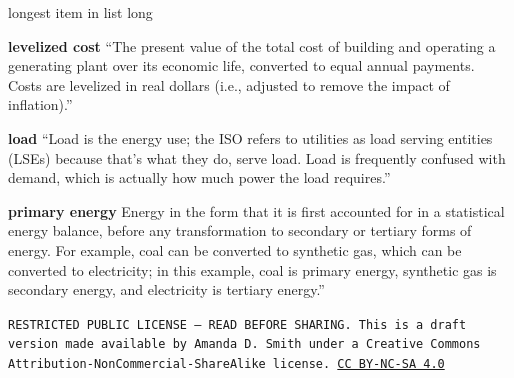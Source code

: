 \documentclass[10pt]{article}
\begin{document}
\begin{labeling}{longest item in list long}
\item [\textbf{levelized cost}] ``The present value of the total cost of building and operating a generating plant over its economic life, converted to equal annual payments. Costs are levelized in real dollars (i.e., adjusted to remove the impact of inflation).'' \cite{EIAglossary}

\item [\textbf{load}] ``Load is the energy use; the ISO refers to utilities as load serving entities (LSEs) because that's what they do, serve load. Load is frequently confused with demand, which is actually how much power the load requires.'' \cite{understandingelectricity}

\item [\textbf{primary energy}] Energy in the form that it is first accounted for in a statistical energy balance, before any transformation to secondary or tertiary forms of energy. For example, coal can be converted to synthetic gas, which can be converted to electricity; in this example, coal is primary energy, synthetic gas is secondary energy, and electricity is tertiary energy.'' \cite{EIAglossary}



\end{labeling}



\bigskip

\noindent
\texttt{\footnotesize RESTRICTED PUBLIC LICENSE --- READ BEFORE SHARING. This is a draft version made available by Amanda D. Smith under a Creative Commons Attribution-NonCommercial-ShareAlike license. 
\href{https://creativecommons.org/licenses/by-nc-sa/4.0/}{CC BY-NC-SA 4.0}}


\printbibliography
\end{document}
